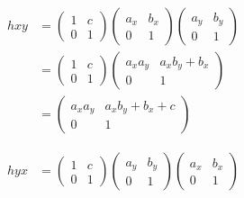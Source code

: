 \begin{description}
    \begin{minipage}{0.40\textwidth}
        \begin{align*}
            hxy &= 
            \begin{pmatrix}
                1 & c \\
                0 & 1    
            \end{pmatrix}
            \begin{pmatrix}
                a_x & b_x \\
                0 & 1    
            \end{pmatrix}
            \begin{pmatrix}
                a_y & b_y \\
                0 & 1    
            \end{pmatrix}\\
            &= 
            \begin{pmatrix}
                1 & c \\
                0 & 1    
            \end{pmatrix}
            \begin{pmatrix}
                a_xa_y & a_xb_y + b_x \\
                0 & 1    
            \end{pmatrix}\\
            &= 
            \begin{pmatrix}
                a_xa_y & a_xb_y + b_x + c \\
                0 & 1    
            \end{pmatrix}
        \end{align*}
    \end{minipage}
    \hfill
    \begin{minipage}{0.5\textwidth}
        \begin{align*}
            hyx &= 
            \begin{pmatrix}
                1 & c \\
                0 & 1    
            \end{pmatrix}
            \begin{pmatrix}
                a_y & b_y \\
                0 & 1    
            \end{pmatrix}
            \begin{pmatrix}
                a_x & b_x \\
                0 & 1    
            \end{pmatrix}\\

\end{align*}
\end{minipage}
\end{description}
